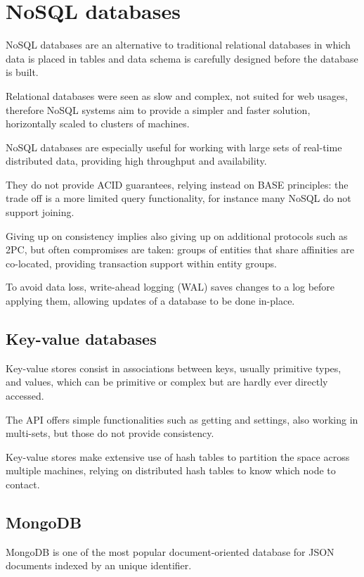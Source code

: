 \section{NoSQL databases}
NoSQL databases are an alternative to traditional relational databases in which data is placed in tables and data schema is carefully designed before the database is built. 

Relational databases were seen as slow and complex, not suited for web usages, therefore NoSQL systems aim to provide a simpler and faster solution, horizontally scaled to clusters of machines.

NoSQL databases are especially useful for working with large sets of real-time distributed data, providing high throughput and availability. 

They do not provide ACID guarantees, relying instead on BASE principles: the trade off is a more limited query functionality, for instance many NoSQL do not support joining.

Giving up on consistency implies also giving up on additional protocols such as 2PC, but often compromises are taken: groups of entities that share affinities are co-located, providing transaction support within entity groups. 

To avoid data loss, write-ahead logging (WAL) saves changes to a log before applying them, allowing updates of a database to be done in-place.

\subsection{Key-value databases}
Key-value stores consist in associations between keys, usually primitive types, and values, which can be primitive or complex but are hardly ever directly accessed.

The API offers simple functionalities such as getting and settings, also working in multi-sets, but those do not provide consistency. 

Key-value stores make extensive use of hash tables to partition the space across multiple machines, relying on distributed hash tables to know which node to contact.

\subsection{MongoDB}
MongoDB is one of the most popular document-oriented database for JSON documents indexed by an unique identifier.

